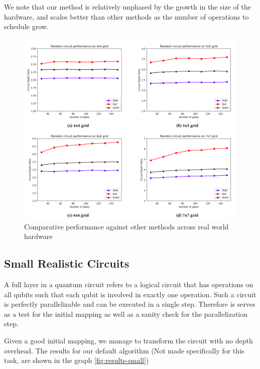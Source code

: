 \documentclass[%
 reprint,
 amsmath,amssymb,
 aps,
]{revtex4-2}
\begin{document}
We note that our method is relatively unphased by the growth in the size of the hardware, and scales better than other methods as the number of operations to schedule grow.

\begin{figure}[H]
    \includegraphics[width=\linewidth]{images/results-random.png}
    \caption{\label{fig:results-random}
        Comparative performance against other methods across real world hardware}
\end{figure}


\subsection{\label{sec:results-small}Small Realistic Circuits}

A full layer in a quantum circuit refers to a logical circuit that has operations on all qubits such that each qubit is involved in exactly one operation. Such a circuit is perfectly parallelizable and can be executed in a single step. Therefore is serves as a test for the initial mapping as well as a sanity check for the parallelization step.

Given a good initial mapping, we manage to transform the circuit with no depth overhead. The results for our default algorithm (Not made specifically for this task, are shown in the graph \ref{fig:results-small})
\end{document}

